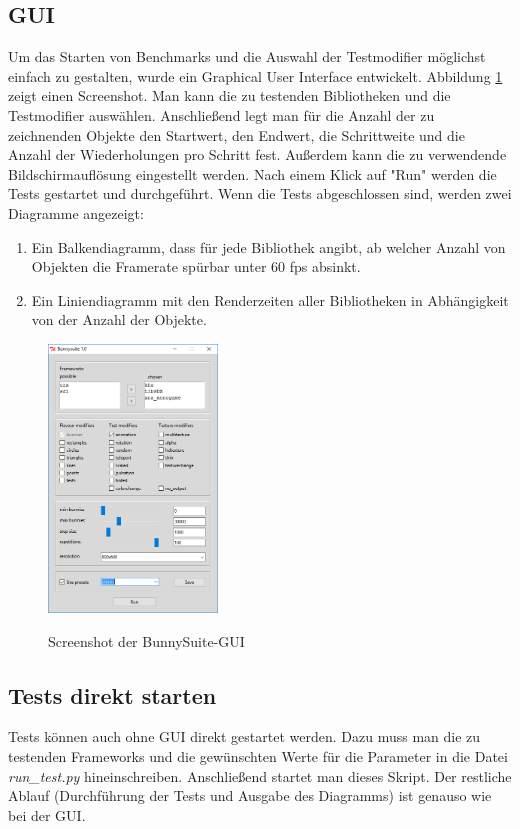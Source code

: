 \subsection{GUI}
Um das Starten von Benchmarks und die Auswahl der Testmodifier möglichst einfach zu gestalten, wurde ein Graphical User Interface entwickelt. Abbildung \ref{dia:gui} zeigt einen Screenshot. Man kann die zu testenden Bibliotheken und die Testmodifier auswählen. Anschließend legt man für die Anzahl der zu zeichnenden Objekte den Startwert, den Endwert, die Schrittweite und die Anzahl der Wiederholungen pro Schritt fest. Außerdem kann die zu verwendende Bildschirmauflösung eingestellt werden. Nach einem Klick auf "Run" werden die Tests gestartet und durchgeführt. Wenn die Tests abgeschlossen sind, werden zwei Diagramme angezeigt: 
\begin{enumerate}
\item Ein Balkendiagramm, dass für jede Bibliothek angibt, ab welcher Anzahl von Objekten die Framerate spürbar unter 60 fps absinkt.
\item Ein Liniendiagramm mit den Renderzeiten aller Bibliotheken in Abhängigkeit von der Anzahl der Objekte.
\end{enumerate}

\begin{figure}[h]
\caption{Screenshot der BunnySuite-GUI}
\centering
\includegraphics[width=0.4\textwidth]{gui}
\label{dia:gui}
\end{figure}

\subsection{Tests direkt starten}
Tests können auch ohne GUI direkt gestartet werden. Dazu muss man die zu testenden Frameworks und die gewünschten Werte für die Parameter in die Datei \textit{run\_test.py} hineinschreiben. Anschließend startet man dieses Skript. Der restliche Ablauf (Durchführung der Tests und Ausgabe des Diagramms) ist genauso wie bei der GUI.

